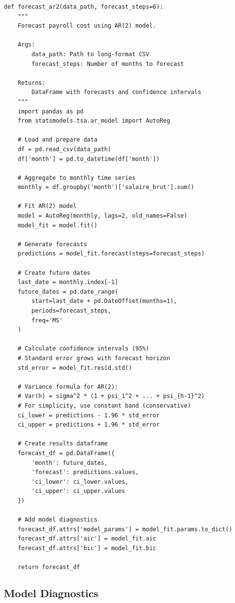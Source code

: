 \begin{lstlisting}[style=pythonstyle]
def forecast_ar2(data_path, forecast_steps=6):
    """
    Forecast payroll cost using AR(2) model.
    
    Args:
        data_path: Path to long-format CSV
        forecast_steps: Number of months to forecast
    
    Returns:
        DataFrame with forecasts and confidence intervals
    """
    import pandas as pd
    from statsmodels.tsa.ar_model import AutoReg
    
    # Load and prepare data
    df = pd.read_csv(data_path)
    df['month'] = pd.to_datetime(df['month'])
    
    # Aggregate to monthly time series
    monthly = df.groupby('month')['salaire_brut'].sum()
    
    # Fit AR(2) model
    model = AutoReg(monthly, lags=2, old_names=False)
    model_fit = model.fit()
    
    # Generate forecasts
    predictions = model_fit.forecast(steps=forecast_steps)
    
    # Create future dates
    last_date = monthly.index[-1]
    future_dates = pd.date_range(
        start=last_date + pd.DateOffset(months=1),
        periods=forecast_steps,
        freq='MS'
    )
    
    # Calculate confidence intervals (95%)
    # Standard error grows with forecast horizon
    std_error = model_fit.resid.std()
    
    # Variance formula for AR(2):
    # Var(h) = sigma^2 * (1 + psi_1^2 + ... + psi_{h-1}^2)
    # For simplicity, use constant band (conservative)
    ci_lower = predictions - 1.96 * std_error
    ci_upper = predictions + 1.96 * std_error
    
    # Create results dataframe
    forecast_df = pd.DataFrame({
        'month': future_dates,
        'forecast': predictions.values,
        'ci_lower': ci_lower.values,
        'ci_upper': ci_upper.values
    })
    
    # Add model diagnostics
    forecast_df.attrs['model_params'] = model_fit.params.to_dict()
    forecast_df.attrs['aic'] = model_fit.aic
    forecast_df.attrs['bic'] = model_fit.bic
    
    return forecast_df
\end{lstlisting}

\subsection{Model Diagnostics}

